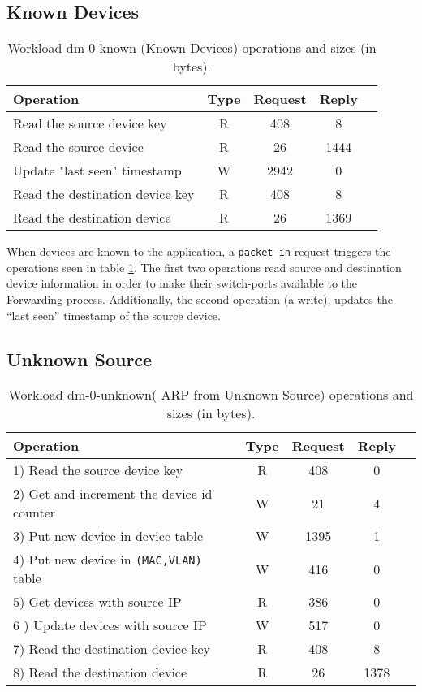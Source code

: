 \subsection{Known Devices}

\begin{table}[ht]
\small
\centering 
\begin{tabular}{l c c c c}
Operation & Type & Request & Reply \\ \toprule 
Read the source device key & R & 408 & 8\\
Read the source device & R & 26 & 1444\\
Update "last seen" timestamp & W & 2942 & 0\\
Read the destination device key & R & 408 & 8\\
Read the destination device & R & 26 & 1369 \\
\end{tabular}
\caption[Workload dm-0-known (Known Devices) operations]{Workload
  dm-0-known (Known Devices) operations and sizes (in bytes).}
\label{table:ops:dm-0-known}
\end{table}

When devices are known to the application, a \texttt{packet-in} request
triggers the operations seen in table \ref{table:ops:dm-0-known}. The
first two operations read source and destination device
information in order to make their switch-ports available to the
Forwarding process. Additionally, the second operation (a write), 
updates the ``last seen'' timestamp of the source device.

\subsection{Unknown Source}
\small
\begin{table}[ht]
\centering 
\begin{tabular}{l c c c c}
Operation & Type & Request & Reply \\ \toprule 
1) Read the source device key & R & 408 & 0\\
2) Get and increment the device id counter & W & 21 & 4\\
3) Put new device in device table & W & 1395 & 1\\
4) Put new device in \texttt{(MAC,VLAN)} table & W & 416 & 0\\
5) Get devices with source IP & R & 386 & 0\\
6 ) Update devices with source IP & W & 517 & 0\\
7) Read the destination device key & R & 408 & 8\\
8) Read the destination device & R & 26 & 1378 \\\bottomrule
\end{tabular}
\caption[Workload dm-0-unknown( ARP from Unknown Source)
operations]{Workload dm-0-unknown( ARP from Unknown Source) operations
  and sizes (in bytes).}
\label{table:ops:dm-0-unknown}
\end{table}


